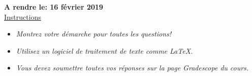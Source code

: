 \documentclass[12pt]{article}
\theoremstyle{definition}
\begin{document}
\fancyhead{}
\fancyfoot{}


\vspace{1cm}

{\bf A rendre le: 16 février 2019}\\

\vspace{-0.5cm}
\underline{Instructions}
\renewcommand{\labelitemi}{\textbullet}
\begin{itemize}
\item \emph{Montrez votre démarche pour toutes les questions!}
\item \emph{Utilisez un logiciel de traitement de texte comme LaTeX.}
\item \emph{Vous devez soumettre toutes vos réponses sur la page Gradescope du cours.}
\end{itemize}









\end{document}
